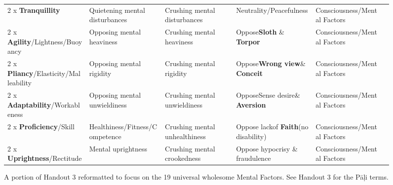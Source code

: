 \begin{figure} [H]
\begin{tabular}{P{0.25\textwidth} | C{.185\textwidth} C{0.185\textwidth} C{0.185\textwidth} C{0.195\textwidth} m{0mm}}
2 x \textbf{Tranquillity} & Quietening mental disturbances & Crushing mental disturbances & Neutrality/\newline Peacefulness & Consciousness/\newline Mental Factors &\\[9mm]
2 x \textbf{Agility}/\newline Lightness/Buoyancy & Opposing mental heaviness & Crushing mental heaviness & Oppose\newline \textbf{Sloth} \& \textbf{Torpor} & Consciousness/\newline Mental Factors &\\[9mm]
2 x \textbf{Pliancy}/\newline Elasticity/Malleability & Opposing mental rigidity & Crushing mental rigidity & Oppose\newline \textbf{Wrong view}\newline \& \textbf{Conceit} & Consciousness/\newline Mental Factors &\\[9mm]
2 x \textbf{Adaptability}/\newline Workableness & Opposing mental unwieldiness & Crushing mental unwieldiness & Oppose\newline Sense desire\newline \& \textbf{Aversion} & Consciousness/\newline Mental Factors &\\[9mm]
2 x \textbf{Proficiency}/\newline Skill & Healthiness/\newline Fitness/\newline Competence & Crushing mental unhealthiness & Oppose lack\newline of \textbf{Faith}\newline (no disability) & Consciousness/\newline Mental Factors &\\[9mm]
2 x \textbf{Uprightness}/\newline Rectitude & Mental uprightness & Crushing mental crookedness & Oppose hypocrisy \& fraudulence & Consciousness/\newline Mental Factors &\\[9mm]
\bottomrule
\end{tabular} 

\caption{A portion of Handout 3 reformatted to focus on the 19 universal wholesome Mental Factors. See Handout 3 for the Pāḷi terms.}

\end{figure}


